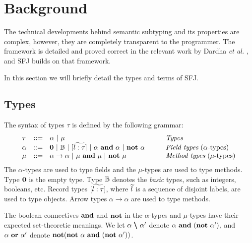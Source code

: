 \section{Background}
\label{sec:background}
The technical developments behind semantic subtyping and its properties are complex, however, they are completely transparent to the programmer. The framework is detailed and proved correct in the relevant work by Dardha \emph{et al.} \cite{Dardha2013,Dardha2017}, and SFJ builds on that framework.

In this section we will briefly detail the types and terms of SFJ.

\subsection{Types}
\label{sec:types}
The syntax of types $\tau$ is defined by the following grammar:
$$
\begin{array}{llll}
\tau & ::= & \alpha \ |\ \mu
& \mbox{{\em Types}}
\\
\alpha & ::=  & \zero \ |\ \btypes \ |\ [\wt{l:\tau}] \ |\ \alpha\ \synwedge\ \alpha \ |\ \synneg\ \alpha
\qquad
& \mbox{{\em Field types} ($\alpha $-types)}
\\
\mu & ::=  & \alpha \to \alpha \ |\ \mu\ \synwedge\ \mu \ |\ \synneg\ \mu
& \mbox{{\em Method types} ($\mu $-types)}
\end{array}
$$
The $\alpha$-types are used to type fields and the $\mu$-types are used to type methods.
Type $\mathbf{0}$ is the empty type.
Type ${\mathbb B}$ denotes the \emph{basic} types, such as integers, booleans, etc.
{Record} types $[\widetilde{l:\tau}]$, where $\widetilde{l}$ is a sequence of disjoint labels, are used to type objects.
Arrow types $\alpha \to \alpha$ are used to type methods.

The boolean connectives $\bf{and}$ and $\bf{not}$ in the $\alpha$-types and $\mu$-types have their expected set-theoretic meanings.
We let $\alpha\ \pmb{\backslash}\ \alpha'$  denote $\alpha\ \mathbf{and}\ (\mathbf{not}\ \alpha')$, and $\alpha\ \mathbf{or}\ \alpha'$  denote $\synneg(\synneg\ \alpha\ \synwedge\ (\synneg\ \alpha'))$.

